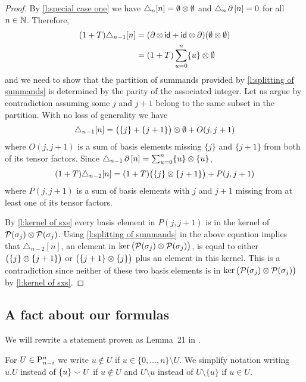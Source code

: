 \begin{proof}
	By \cref{l:special case one} we have $\triangle_{n} [n] = \emptyset \ot \emptyset$ and $\triangle_{n} \bd \, [n] = 0$ for all $n \in \N$.
	Therefore,
	\begin{align*}
	(1+T) \triangle_{n-1} [n] &=
	(\bd \ot \, \id + \id \ot \bd) (\emptyset \ot \emptyset) \\ &=
	(1+T) \sum_{u=0}^n \{u\} \ot \emptyset
	\end{align*}
	and we need to show that the partition of summands provided by \cref{l:splitting of summands} is determined by the parity of the associated integer.
	Let us argue by contradiction assuming some $j$ and $j+1$ belong to the same subset in the partition.
	With no loss of generality we have
	\[
	\triangle_{n-1} [n] = \big( \{j\} + \{j+1\} \big) \ot \emptyset + O(j, j+1)
	\]
	where $O(j, j+1)$ is a sum of basis elements missing $\{j\}$ and $\{j+1\}$ from both of its tensor factors.
	Since $\triangle_{n-1} \bd \, [n] = \sum_{u=0}^{n} \{u\} \ot \{u\}$,
	\[
	(1+T) \triangle_{n-2} [n] = (1+T) \big( \{j\} \ot \{j+1\} \big) + P(j, j+1)
	\]
	where $P(j, j+1)$ is a sum of basis elements with $j$ and $j+1$ missing from at least one of its tensor factors.

	By \cref{l:kernel of sxs} every basis element in $P(j,j+1)$ is in the kernel of $\cP(\sigma_j) \ot \cP(\sigma_j)$.
	Using \cref{l:splitting of summands} in the above equation implies that $\triangle_{n-2} [n]$, an element in $\ker \big( \cP(\sigma_j) \ot \cP(\sigma_j) \big)$, is equal to either $\big( \{j\} \ot \{j+1\} \big)$ or $\big( \{j+1\} \ot \{j\} \big)$ plus an element in this kernel.
	This is a contradiction since neither of these two basis elements is in $\ker \big( \cP(\sigma_j) \ot \cP(\sigma_j) \big)$ by \cref{l:kernel of sxs}.
\end{proof}

\subsection{A fact about our formulas} \label{ss:fact}

We will rewrite a statement proven as Lemma~21 in \cite{medina2021fast_sq}.

\begin{notation}
	For $U \in \P_{n-i}^n$ we write $u \notin U$ if $u \in \{0, \dots, n\} \setminus U$.
	We simplify notation writing $u.U$ instead of $\{u\} \union U$ if $u \notin U$ and $U \setminus u$ instead of $U \setminus \{u\}$ if $u \in U$.
\end{notation}

